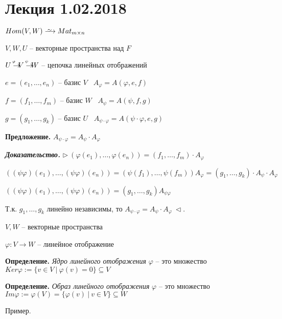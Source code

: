 \section{Лекция 1.02.2018}

$Hom(V, W) \iso Mat_{m \times n}$

$V, W, U$ -- векторные пространства над $F$

\vspace{\baselineskip}
$U \rightarrow^{\hspace{-4mm}^{\varphi}} V \rightarrow^{\hspace{-4mm}^{\psi}} W$ -- цепочка линейных отображений

$e = (e_1, \dots, e_n)$ -- базис $V$ \ $A_{\varphi} = A(\varphi, e, f)$

$f = (f_1, \dots, f_m)$ -- базис $W$ \ $A_{\psi} = A(\psi, f, g)$

$g = (g_1, \dots, g_k)$ -- базис $U$ \ $A_{\psi \cdot \varphi} = A(\psi \cdot \varphi, e, g)$

\vspace{\baselineskip}
\textbf{Предложение.} $A_{\psi \cdot \varphi} = A_{\psi} \cdot A_{\varphi}$

\vspace{\baselineskip}
\textbf{\textit{Доказательство.}} $\rhd \ (\varphi(e_1), \dots, \varphi(e_n)) = (f_1, \dots, f_m) \cdot A_{\varphi}$

$((\psi \varphi) (e_1), \dots, (\psi \varphi) (e_n)) = (\psi(f_1), \dots, \psi(f_m)) A_{\varphi} = (g_1, \dots, g_k) \cdot A_{\psi} \cdot A_{\varphi}$

$((\psi \varphi) (e_1), \dots, (\psi \varphi) (e_n)) = (g_1, \dots, g_k) A_{\psi \varphi}$

Т.к. $g_1, \dots, g_k$ линейно независимы, то $A_{\psi \cdot \varphi} = A_{\psi} \cdot A_{\varphi} \ \lhd$.

\vspace{\baselineskip}
$V, W$ -- векторные пространства

$\varphi: V \rightarrow W$ -- линейное отображение

\textbf{Определение.} \textit{Ядро линейного отображения} $\varphi$ -- это множество $Ker \varphi := \{v \in V \ | \ \varphi(v) = 0 \} \subseteq V$

\textbf{Определение.} \textit{Образ линейного отображения} $\varphi$ -- это множество $Im \varphi := \varphi(V) = \{\varphi(v) \ | \ v \in V\} \subseteq W$

\vspace{\baselineskip}
Пример. 

